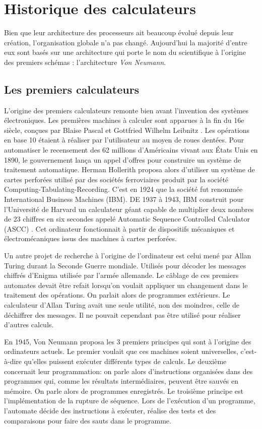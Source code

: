 \section{Historique des calculateurs}\label{sec:von}


Bien que leur architecture des processeurs ait beaucoup évolué depuis leur création, l’organisation globale n’a pas changé. Aujourd’hui la majorité d’entre eux sont basés sur une architecture qui porte le nom  du scientifique à l’origine des premiers schémas : l’architecture \textit{Von Neumann}.

\subsection{Les premiers calculateurs}

L'origine des premiers calculateurs remonte bien avant l'invention des systèmes électroniques. Les premières machines à calculer sont apparues à la fin du 16e siècle, conçues par Blaise Pascal et Gottfried Wilhelm Leibnitz \cite{Vie1996}. Les opérations en base 10 étaient à réaliser par l’utilisateur au moyen de roues dentées. 
Pour automatiser le recensement des 62 millions d’Américains vivant aux États Unis en 1890, le gouvernement lança un appel d’offres pour construire un système de traitement automatique. Herman Hollerith proposa alors d’utiliser un système de cartes perforées utilisé par des sociétés ferroviaires produit par la société Computing-Tabulating-Recording.  C’est en 1924 que la société fut renommée  International Business Machines (IBM). DE 1937 à 1943, IBM construit pour l’Université de Harvard un calculateur géant capable de multiplier deux nombres de 23 chiffres en six secondes appelé  Automatic Sequence Controlled Calculator (ASCC) \cite{cortada2016computer}. Cet ordinateur fonctionnait à partir de dispositifs mécaniques et électromécaniques issus des machines à cartes perforées.

Un autre projet de recherche à l'origine de l'ordinateur est celui mené par Allan Turing durant la Seconde Guerre mondiale. Utilisés pour décoder les messages chiffrés d'Enigma utilisée par l'armée allemande. Le câblage de ces premiers automates devait être refait lorsqu'on voulait appliquer un changement dans le traitement des opérations. On parlait alors de programmes extérieurs. Le calculateur d'Allan Turing avait une seule utilité, non des moindres, celle de déchiffrer des messages. Il ne pouvait cependant pas être utilisé pour réaliser d'autres calculs.

En 1945, Von Neumann proposa les 3 premiers principes qui sont à l'origine des ordinateurs actuels. Le premier voulait que ces machines soient universelles, c’est-à-dire qu’elles puissent exécuter différents types de calculs. Le deuxième concernait leur programmation: on parle alors d’instructions organisées dans des programmes qui, comme les résultats intermédiaires, peuvent être sauvés en mémoire. On parle alors de programmes enregistrés. Le troisième principe est l’implémentation de la rupture de séquence. Lors de l’exécution d’un programme, l’automate décide des instructions à exécuter, réalise des tests et des comparaisons pour faire des sauts dans le programme. 


